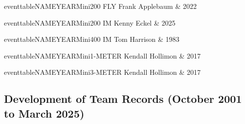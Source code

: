 \begin{minipage}[t]{0.44\textwidth}
\centering
eventtableNAMEYEARMini{200 FLY}{
Frank Applebaum & 2022 \\
}
\end{minipage}\hfill
\begin{minipage}[t]{0.44\textwidth}
\centering
eventtableNAMEYEARMini{200 IM}{
Kenny Eckel & 2025 \\
}
\end{minipage}

\vspace{0.3cm}

\begin{minipage}[t]{0.44\textwidth}
\centering
eventtableNAMEYEARMini{400 IM}{
Tom Harrison & 1983 \\
}
\end{minipage}\hfill
\begin{minipage}[t]{0.44\textwidth}
\centering

\end{minipage}

\vspace{0.3cm}

\begin{minipage}[t]{0.44\textwidth}
\centering
eventtableNAMEYEARMini{1-METER}{
Kendall Hollimon & 2017 \\
}
\end{minipage}\hfill
\begin{minipage}[t]{0.44\textwidth}
\centering

\end{minipage}

\vspace{0.3cm}

\begin{minipage}[t]{0.44\textwidth}
\centering
eventtableNAMEYEARMini{3-METER}{
Kendall Hollimon & 2017 \\
}
\end{minipage}\hfill
\begin{minipage}[t]{0.44\textwidth}
\centering

\end{minipage}

\vspace{0.3cm}

\newpage

\subsection{Development of Team Records (October 2001 to March 2025)}
